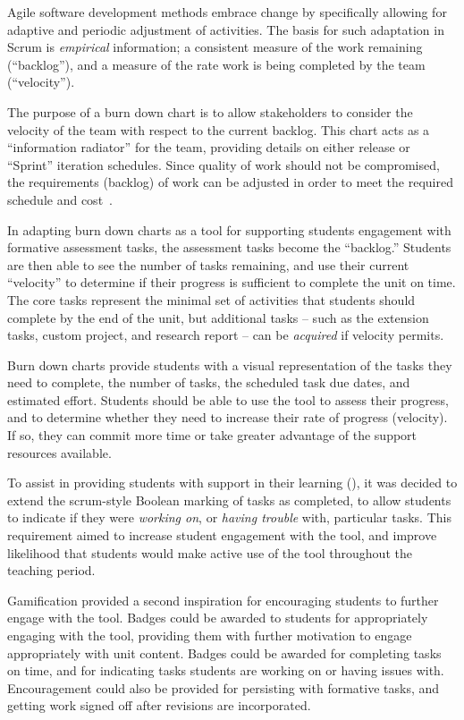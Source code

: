 Agile software development methods \cite{Beck:2001} embrace change \cite{Beck:2000} by specifically allowing for adaptive and periodic adjustment of activities. The basis for such adaptation in Scrum is \emph{empirical} information; a consistent measure of the work remaining (``backlog''), and a measure of the rate work is being completed by the team (``velocity'').

The purpose of a burn down chart is to allow stakeholders to consider the velocity of the team with respect to the current backlog. This chart acts as a ``information radiator'' \cite{Cockburn:2002} for the team, providing details on either release or ``Sprint'' iteration schedules. Since quality of work should not be compromised, the requirements (backlog) of work can be adjusted in order to meet the required schedule and cost~\cite{Sutherland:2007}.

In adapting burn down charts as a tool for supporting students engagement with formative assessment tasks, the assessment tasks become the ``backlog.'' Students are then able to see the number of tasks remaining, and use their current ``velocity'' to determine if their progress is sufficient to complete the unit on time. The core tasks represent the minimal set of activities that students should complete by the end of the unit, but additional tasks -- such as the extension tasks, custom project, and research report -- can be \emph{acquired} if velocity permits.

Burn down charts provide students with a visual representation of the tasks they need to complete, the number of tasks, the scheduled task due dates, and estimated effort. Students should be able to use the tool to assess their progress, and to determine whether they need to increase their rate of progress (velocity). If so, they can commit more time or take greater advantage of the support resources available. 

To assist in providing students with support in their learning (), it was decided to extend the scrum-style Boolean marking of tasks as completed, to allow students to indicate if they were \emph{working on}, or \emph{having trouble} with, particular tasks. This requirement aimed to increase student engagement with the tool, and improve likelihood that students would make active use of the tool throughout the teaching period.

Gamification \cite{Deterding:2011} provided a second inspiration for encouraging students to further engage with the tool. Badges could be awarded to students for appropriately engaging with the tool, providing them with further motivation to engage appropriately with unit content. Badges could be awarded for completing tasks on time, and for indicating tasks students are working on or having issues with. Encouragement could also be provided for persisting with formative tasks, and getting work signed off after revisions are incorporated.

